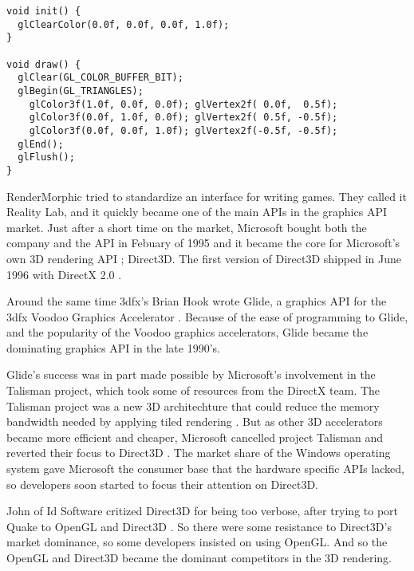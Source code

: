 \begin{lstlisting}[language={[ANSI]C}, caption={OpenGL 1.0 program written in C, that renders a triangle with different colors on the points, and linear interpolation between the colors. This method uses the fixed pipeline to render the triangle. A method which has been deprecated since OpenGL 3.0.}, label={lst:opengl10}]
void init() {
  glClearColor(0.0f, 0.0f, 0.0f, 1.0f);
}

void draw() {
  glClear(GL_COLOR_BUFFER_BIT);
  glBegin(GL_TRIANGLES);
    glColor3f(1.0f, 0.0f, 0.0f); glVertex2f( 0.0f,  0.5f);
    glColor3f(0.0f, 1.0f, 0.0f); glVertex2f( 0.5f, -0.5f);
    glColor3f(0.0f, 0.0f, 1.0f); glVertex2f(-0.5f, -0.5f);
  glEnd();
  glFlush();
}
\end{lstlisting}

RenderMorphic tried to standardize an interface for writing games.
They called it Reality Lab, and it quickly became one of the main \glspl{API} in the graphics \gls{API} market. 
Just after a short time on the market, Microsoft bought both the company and the \gls{API} in Febuary of 1995 and it became the core for Microsoft's own 3D rendering \gls{API} \cite{1997crushed}; Direct3D.
The first version of Direct3D shipped in June 1996 with DirectX 2.0 \cite{wikipedia????directx}. 

Around the same time 3dfx's Brian Hook wrote Glide, a graphics API for the 3dfx Voodoo Graphics Accelerator .
Because of the ease of programming to Glide, and the popularity of the Voodoo graphics accelerators, Glide became the dominating graphics \gls{API} in the late 1990's.

Glide's success was in part made possible by Microsoft's involvement in the Talisman project, which took some of resources from the DirectX team.
The Talisman project was a new 3D architechture that could reduce the memory bandwidth needed by applying tiled rendering \cite{torborg1996talisman}.
But as other 3D accelerators became more efficient and cheaper, Microsoft cancelled project Talisman and reverted their focus to Direct3D \cite{wikipedia????talisman}.
The market share of the Windows operating system gave Microsoft the consumer base that the hardware specific \glspl{API} lacked, so developers soon started to focus their attention on Direct3D.

John \citet{carmack1996plan} of Id Software critized Direct3D for being too verbose, after trying to port Quake to OpenGL and Direct3D  .
So there were some resistance to Direct3D's market dominance, so some developers insisted on using OpenGL.
And so the OpenGL and Direct3D became the dominant competitors in the 3D rendering. 

